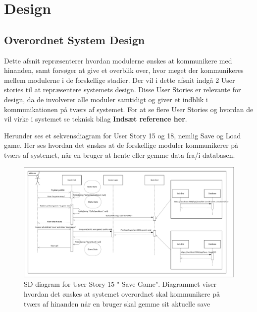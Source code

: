 \section{Design}

\subsection{Overordnet System Design}
\noindent Dette afsnit repræsenterer hvordan modulerne ønskes at kommunikere med hinanden, samt forsøger at give et overblik over, hvor meget der kommunikeres mellem modulerne i de forskellige stadier. Der vil i dette afsnit indgå 2 User stories til at repræsentere systemets design. Disse User Stories er relevante for design, da de involverer alle moduler samtidigt og giver et indblik i kommunikationen på tværs af systemet. For at se flere User Stories og hvordan de vil virke i systemet se teknisk bilag \textbf{Indsæt reference her}.

\noindent Herunder ses et sekvensdiagram for User Story 15 og 18, nemlig Save og Load game. Her ses hvordan det ønskes at de forskellige moduler kommunikerer på tværs af systemet, når en bruger at hente eller gemme data fra/i databasen.
\begin{figure}[H]
\centering
\includegraphics[width = \textwidth]{02-Body/Images/Arkitektur-SDSaveGame}
\caption{SD diagram for User Story 15 " Save Game". Diagrammet viser hvordan det ønskes at systemet overordnet skal kommunikere på tværs af hinanden når en bruger skal gemme sit aktuelle save}
\label{fig:Arkitektur-SD-SaveGame}
\end{figure}

